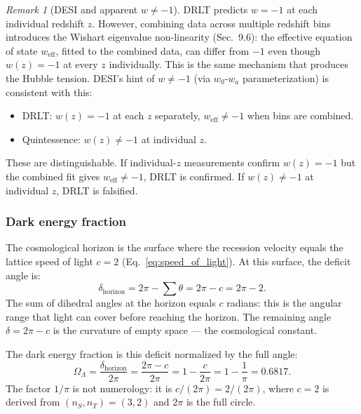 \documentclass[12pt]{article}
\theoremstyle{remark}
\newtheorem{remark}[theorem]{Remark}
\theoremstyle{definition}
\begin{document}
\begin{remark}[DESI and apparent $w \neq -1$]
DRLT predicts $w = -1$ at each individual redshift $z$. However, combining data across multiple redshift bins introduces the Wishart eigenvalue non-linearity (Sec.~9.6): the effective equation of state $w_\text{eff}$, fitted to the combined data, can differ from $-1$ even though $w(z) = -1$ at every $z$ individually. This is the same mechanism that produces the Hubble tension. DESI's hint of $w \neq -1$ (via $w_0$-$w_a$ parameterization) is consistent with this:

\begin{itemize}
\item DRLT: $w(z) = -1$ at each $z$ separately, $w_\text{eff} \neq -1$ when bins are combined.
\item Quintessence: $w(z) \neq -1$ at individual $z$.
\end{itemize}

These are distinguishable. If individual-$z$ measurements confirm $w(z) = -1$ but the combined fit gives $w_\text{eff} \neq -1$, DRLT is confirmed. If $w(z) \neq -1$ at individual $z$, DRLT is falsified.
\end{remark}

\subsubsection{Dark energy fraction}

The cosmological horizon is the surface where the recession velocity equals the lattice speed of light $c = 2$ (Eq.~\ref{eq:speed_of_light}). At this surface, the deficit angle is:
\begin{equation}
\delta_\text{horizon} = 2\pi - \sum\theta = 2\pi - c = 2\pi - 2.
\end{equation}
The sum of dihedral angles at the horizon equals $c$ radians: this is the angular range that light can cover before reaching the horizon. The remaining angle $\delta = 2\pi - c$ is the curvature of empty space --- the cosmological constant.

The dark energy fraction is this deficit normalized by the full angle:
\begin{equation}
\boxed{\Omega_\Lambda = \frac{\delta_\text{horizon}}{2\pi} = \frac{2\pi - c}{2\pi} = 1 - \frac{c}{2\pi} = 1 - \frac{1}{\pi} = 0.6817.}
\end{equation}
The factor $1/\pi$ is not numerology: it is $c/(2\pi) = 2/(2\pi)$, where $c = 2$ is derived from $(n_S, n_T) = (3, 2)$ and $2\pi$ is the full circle.
\end{document}
